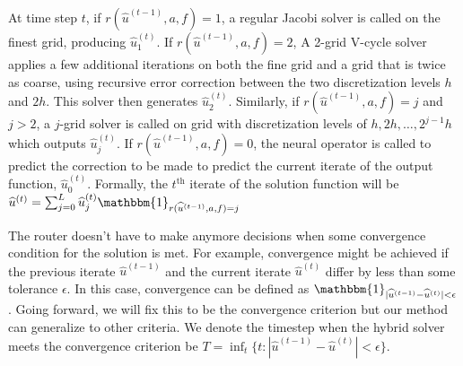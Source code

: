 \documentclass[12pt]{article}
\begin{document}
At time step $t$, if $r(\widehat{u}^{(t - 1)}, a, f) = 1$, a regular Jacobi solver is called on the finest grid, producing $\widehat{u}^{(t)}_1$. If $r(\widehat{u}^{(t - 1)}, a, f) = 2$, A 2-grid V-cycle solver applies a few additional iterations on both the fine grid and a grid that is twice as coarse, using recursive error correction between the two discretization levels $h$ and $2h$. This solver then generates $\widehat{u}^{(t)}_2$. Similarly, if $r(\widehat{u}^{(t - 1)}, a, f) = j$ and $j > 2$, a $j$-grid solver is called on grid with discretization levels of $h, 2h, \ldots, 2^{j-1}h$ which outputs $\widehat{u}^{(t)}_j$. If $r(\widehat{u}^{(t - 1)}, a, f) = 0$, the neural operator is called to predict the correction to be made to predict the current iterate of the output function, $\widehat{u}^{(t)}_0$. Formally, the $t^{\text{th}}$ iterate of the solution function will be $\widehat{u}^{(t)} = \sum_{j = 0}^{L} \widehat{u}^{(t)}_j\mathbbm{1}_{r(\widehat{u}^{(t - 1)}, a, f)  = j}$ 


The router doesn't have to make anymore decisions when some convergence condition for the solution is met. For example, convergence might be achieved if the previous iterate $\widehat{u}^{(t - 1)}$ and the current iterate $\widehat{u}^{(t)}$ differ by less than some tolerance $\epsilon$. In this case, convergence can be defined as $\mathbbm{1}_{|\widehat{u}^{(t - 1)} - \widehat{u}^{(t)}| < \epsilon}$. Going forward, we will fix this to be the convergence criterion but our method can generalize to other criteria. We denote the timestep when the hybrid solver meets the convergence criterion be $T = \inf_t \{t: |\widehat{u}^{(t - 1)} - \widehat{u}^{(t)}| < \epsilon\}$.
\end{document}
